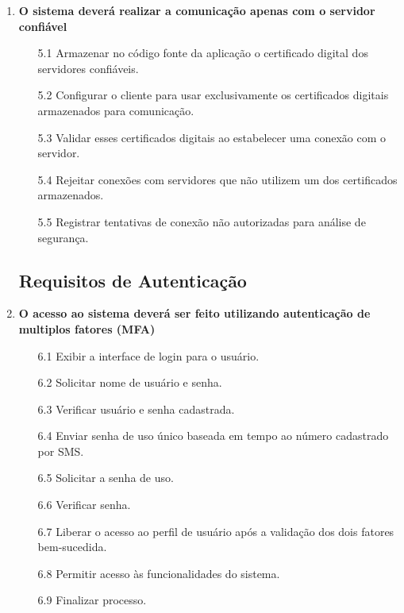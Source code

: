 \begin{enumerate}
        \item \textbf{O sistema deverá realizar a comunicação apenas com o servidor confiável}
        \begin{enumerate}
            \item[5.1] Armazenar no código fonte da aplicação o certificado digital dos servidores confiáveis.
            \item[5.2] Configurar o cliente para usar exclusivamente os certificados digitais armazenados para comunicação.
            \item[5.3] Validar esses certificados digitais ao estabelecer uma conexão com o servidor.
            \item[5.4] Rejeitar conexões com servidores que não utilizem um dos certificados armazenados.
            \item[5.5] Registrar tentativas de conexão não autorizadas para análise de segurança.
        \end{enumerate}
    
        \subsection{Requisitos de Autenticação}
    
        \item \textbf{O acesso ao sistema deverá ser feito utilizando autenticação de multiplos fatores (MFA)}
        \begin{enumerate}
            \item[6.1] Exibir a interface de login para o usuário.
            \item[6.2] Solicitar nome de usuário e senha.
            \item[6.3] Verificar usuário e senha cadastrada.
            \item[6.4] Enviar senha de uso único baseada em tempo ao número cadastrado por SMS.
            \item[6.5] Solicitar a senha de uso.
            \item[6.6] Verificar senha.
            \item[6.7] Liberar o acesso ao perfil de usuário  após a validação dos dois fatores bem-sucedida.
            \item[6.8] Permitir acesso às funcionalidades do sistema.
            \item[6.9] Finalizar processo.
        \end{enumerate}
    

\end{enumerate}

